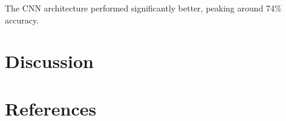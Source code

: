 \documentclass[10pt,twocolumn,letterpaper]{article}
\begin{document}
The CNN architecture performed significantly better, peaking around 74\%
accuracy.

\section{Discussion}

\section{References}


%
%
%
%
%
%
\end{document}
